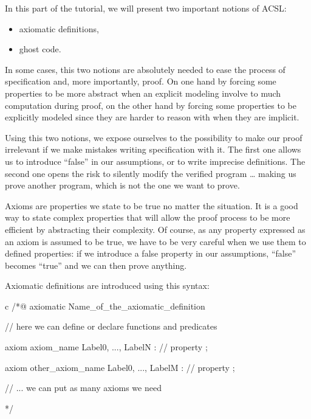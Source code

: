 \documentclass[middle]{zmdocument}
\begin{document}


In this part of the tutorial, we will present two important notions of
ACSL:



\begin{itemize}
\item axiomatic definitions,
\item ghost code.
\end{itemize}


In some cases, this two notions are absolutely needed to ease the
process of specification and, more importantly, proof. On one hand by
forcing some properties to be more abstract when an explicit modeling
involve to much computation during proof, on the other hand by forcing
some properties to be explicitly modeled since they are harder to reason
with when they are implicit.




Using this two notions, we expose ourselves to the possibility to make
our proof irrelevant if we make mistakes writing specification with it.
The first one allows us to introduce ``false'' in our assumptions, or to
write imprecise definitions. The second one opens the risk to silently
modify the verified program \ldots{} making us prove another program,
which is not the one we want to prove.





Axioms are properties we state to be true no matter the situation. It is
a good way to state complex properties that will allow the proof process
to be more efficient by abstracting their complexity. Of course, as any
property expressed as an axiom is assumed to be true, we have to be very
careful when we use them to defined properties: if we introduce a false
property in our assumptions, ``false'' becomes ``true'' and we can then
prove anything.





Axiomatic definitions are introduced using this syntax:



\begin{CodeBlock}{c}
/*@
  axiomatic Name_of_the_axiomatic_definition {
    // here we can define or declare functions and predicates

    axiom axiom_name { Label0, ..., LabelN }:
      // property ;

    axiom other_axiom_name { Label0, ..., LabelM }:
      // property ;

    // ... we can put as many axioms we need
  }
*/
\end{CodeBlock}
\end{document}
